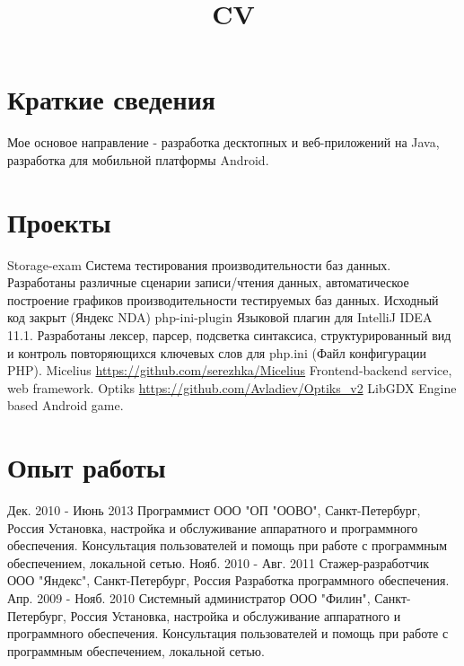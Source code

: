 \documentclass[11pt,a4paper,russian]{moderncv}
\title{CV}
\begin{document}
\maketitle

\section{Краткие сведения}
\cvline
  {}
  {Мое основое направление - разработка десктопных и веб-приложений на Java, \newline{} 
  разработка для мобильной платформы Android.}

\section{Проекты}
\cvline
  {Storage-exam}
  {Система тестирования производительности баз данных.\newline{} 
  Разработаны различные сценарии записи/чтения данных, автоматическое построение графиков производительности тестируемых баз данных.\newline{} Исходный код закрыт (Яндекс NDA)}
\cvline
  {php-ini-plugin}
  {Языковой плагин для IntelliJ IDEA 11.1. \newline{} 
  Разработаны лексер, парсер, подсветка синтаксиса, структурированный вид и контроль повторяющихся ключевых слов для php.ini (Файл конфигурации PHP).}  
\cvline
  {Micelius}
  {\url{https://github.com/serezhka/Micelius}\newline{}
  Frontend-backend service, web framework.}
\cvline
  {Optiks}
  {\url{https://github.com/Avladiev/Optiks_v2}\newline{}
  LibGDX Engine based Android game.}

\section{Опыт работы}
\cventry
  {Дек. 2010 - Июнь 2013}
  {Программист}
  {ООО "ОП "ООВО", Санкт-Петербург, Россия}
  {}{}
  {Установка, настройка и обслуживание аппаратного и программного обеспечения. 
  \newline{}Консультация пользователей и помощь при работе с программным обеспечением, локальной сетью.}
\cventry
  {Нояб. 2010 - Авг. 2011}
  {Стажер-разработчик}
  {ООО "Яндекс", Санкт-Петербург, Россия}
  {}{}
  {Разработка программного обеспечения.}
\cventry
  {Апр. 2009 - Нояб. 2010}
  {Системный администратор}
  {ООО "Филин", Санкт-Петербург, Россия}
  {}{}
  {Установка, настройка и обслуживание аппаратного и программного обеспечения. 
  \newline{}Консультация пользователей и помощь при работе с программным обеспечением, локальной сетью.}  
\end{document}
